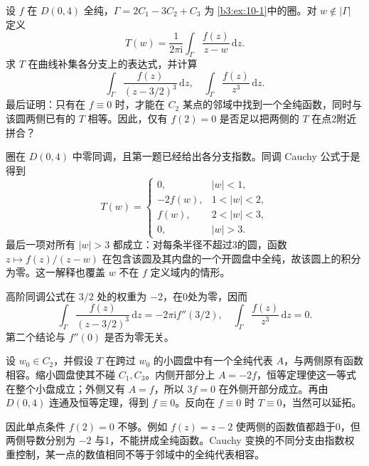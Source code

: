 \begin{exercise}\label{b3:ex:10-3}
设 \(f\) 在 \(D(0,4)\) 全纯，\(\Gamma=2C_1-3C_2+C_3\) 为 \cref{b3:ex:10-1}中的圈。对 \(w\notin|\Gamma|\) 定义
\[
 T(w)=\frac1{2\pi\mathrm i}\int_\Gamma
              \frac{f(z)}{z-w}\,\mathrm dz.
\]
求 \(T\) 在曲线补集各分支上的表达式，并计算
\[
 \int_\Gamma\frac{f(z)}{(z-3/2)^3}\,\mathrm dz,
 \quad
 \int_\Gamma\frac{f(z)}{z^3}\,\mathrm dz.
\]
最后证明：只有在 \(f\equiv0\) 时，才能在 \(C_2\) 某点的邻域中找到一个全纯函数，同时与该圆两侧已有的 \(T\) 相等。因此，仅有 \(f(2)=0\) 是否足以把两侧的 \(T\) 在点2附近拼合？
\end{exercise}
\begin{solution}
圈在 \(D(0,4)\) 中零同调，且第一题已经给出各分支指数。同调 Cauchy 公式于是得到
\[
 T(w)=
 \begin{cases}
 0,&|w|<1,\\
 -2f(w),&1<|w|<2,\\
 f(w),&2<|w|<3,\\
 0,&|w|>3.
 \end{cases}
\]
最后一项对所有 \(|w|>3\) 都成立：对每条半径不超过3的圆，函数 \(z\mapsto f(z)/(z-w)\) 在包含该圆及其内盘的一个开圆盘中全纯，故该圆上的积分为零。这一解释也覆盖 \(w\) 不在 \(f\) 定义域内的情形。

高阶同调公式在 \(3/2\) 处的权重为 \(-2\)，在0处为零，因而
\[
 \int_\Gamma\frac{f(z)}{(z-3/2)^3}\,\mathrm dz
 =-2\pi\mathrm i f''(3/2),\quad
 \int_\Gamma\frac{f(z)}{z^3}\,\mathrm dz=0.
\]
第二个结论与 \(f''(0)\) 是否为零无关。

设 \(w_0\in C_2\)，并假设 \(T\) 在跨过 \(w_0\) 的小圆盘中有一个全纯代表 \(A\)，与两侧原有函数相容。缩小圆盘使其不碰 \(C_1,C_3\)。内侧开部分上 \(A=-2f\)，恒等定理使这一等式在整个小盘成立；外侧又有 \(A=f\)，所以 \(3f=0\) 在外侧开部分成立。再由 \(D(0,4)\) 连通及恒等定理，得到 \(f\equiv0\)。反向在 \(f\equiv0\) 时 \(T\equiv0\)，当然可以延拓。

因此单点条件 \(f(2)=0\) 不够。例如 \(f(z)=z-2\) 使两侧的函数值都趋于0，但两侧导数分别为 \(-2\) 与1，不能拼成全纯函数。Cauchy 变换的不同分支由指数权重控制，某一点的数值相同不等于邻域中的全纯代表相容。
\end{solution}


